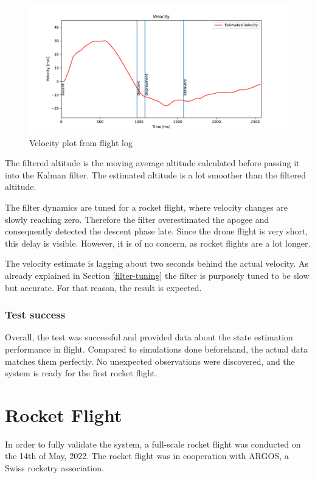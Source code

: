 \begin{figure}[h!]
	\centering
	\includegraphics[width=\textwidth]{plots/drone-velocity}
	\caption{Velocity plot from flight log}
	\label{fig:drone-velocity}
\end{figure}

The filtered altitude is the moving average altitude calculated before passing it into the Kalman filter. The estimated altitude is a lot smoother than the filtered altitude. 

The filter dynamics are tuned for a rocket flight, where velocity changes are slowly reaching zero. Therefore the filter overestimated the apogee and consequently detected the descent phase late. Since the drone flight is very short, this delay is visible. However, it is of no concern, as rocket flights are a lot longer.

The velocity estimate is lagging about two seconds behind the actual velocity. As already explained in Section \ref{filter-tuning} the filter is purposely tuned to be slow but accurate. For that reason, the result is expected.

\subsubsection{Test success}
Overall, the test was successful and provided data about the state estimation performance in flight. Compared to simulations done beforehand, the actual data matches them perfectly. No unexpected observations were discovered, and the system is ready for the first rocket flight. 


\newpage

\section{Rocket Flight}
In order to fully validate the system, a full-scale rocket flight was conducted on the 14th of May, 2022. The rocket flight was in cooperation with ARGOS, a Swiss rocketry association. 

